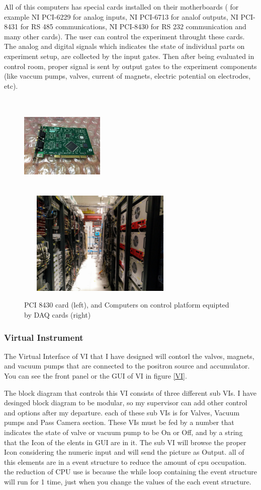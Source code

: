 \documentclass[12pt,a4paper]{article}
\begin{document}
All of this computers has special cards installed on their motherboards ( for example NI PCI-6229 for analog inputs, NI PCI-6713 for analof outputs, NI PCI-8431 for RS 485 communications, NI PCI-8430 for RS 232 communication and many other cards). The user can control the experiment throught these cards. The analog and digital signals which indicates the state of individual parts on experiment setup, are collected by the input gates. Then after being evaluated in control room, proper signal is sent by output gates to the experiment components (like vaccum pumps, valves, current of magnets, electric potential on electrodes, etc).

\begin{figure}[h]
\centering
\includegraphics[width=40mm, height=50mm]{PCI_8430}
\includegraphics[width=80mm, height=50mm]{control_platform}
\caption{PCI 8430 card (left), and Computers on control platform equipted by DAQ cards (right) }
\end{figure}
	
\subsubsection{Virtual Instrument}

The Virtual Interface of VI that I have designed will contorl the valves, magnets, and vacuum pumps that are connected to the positron source and accumulator. You can see the front panel or the GUI of VI in figure \ref{VI}. 

The block diagram that controls this VI consists of three different sub VIs. I have desinged  block diagram to be modular, so my supervisor can add other control and options after my departure. each of these sub VIs is for Valves, Vacuum pumps and Pass Camera section. These VIs must be fed by a number that indicates the state of valve or vacuum pump to be On or Off, and by a string that the Icon of the elents in GUI are in it. The sub VI will browse the proper Icon considering the numeric input and will send the picture as Output. all of this elements are in a event structure to reduce the amount of cpu occupation. the reduction of CPU use is because the while loop containing the event structure will run for 1 time, just when you change the values of the each event structure.
\end{document}
